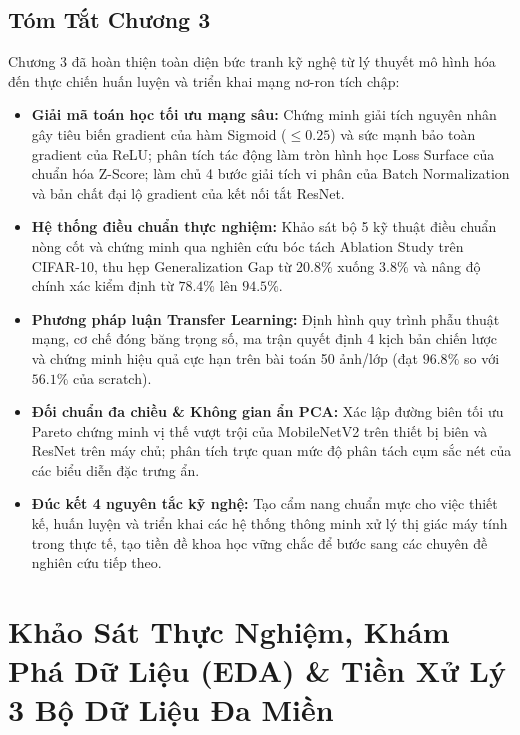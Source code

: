 \documentclass[12pt,a4paper]{report}
\begin{document}
\section{Tóm Tắt Chương 3}
Chương 3 đã hoàn thiện toàn diện bức tranh kỹ nghệ từ lý thuyết mô hình hóa đến thực chiến huấn luyện và triển khai mạng nơ-ron tích chập:
\begin{itemize}[noitemsep,topsep=2pt,leftmargin=*]
    \item \textbf{Giải mã toán học tối ưu mạng sâu:} Chứng minh giải tích nguyên nhân gây tiêu biến gradient của hàm Sigmoid ($\le 0.25$) và sức mạnh bảo toàn gradient của ReLU; phân tích tác động làm tròn hình học Loss Surface của chuẩn hóa Z-Score; làm chủ 4 bước giải tích vi phân của Batch Normalization và bản chất đại lộ gradient của kết nối tắt ResNet.
    \item \textbf{Hệ thống điều chuẩn thực nghiệm:} Khảo sát bộ 5 kỹ thuật điều chuẩn nòng cốt và chứng minh qua nghiên cứu bóc tách Ablation Study trên CIFAR-10, thu hẹp Generalization Gap từ $20.8\%$ xuống $3.8\%$ và nâng độ chính xác kiểm định từ $78.4\%$ lên $94.5\%$.
    \item \textbf{Phương pháp luận Transfer Learning:} Định hình quy trình phẫu thuật mạng, cơ chế đóng băng trọng số, ma trận quyết định 4 kịch bản chiến lược và chứng minh hiệu quả cực hạn trên bài toán 50 ảnh/lớp (đạt $96.8\%$ so với $56.1\%$ của scratch).
    \item \textbf{Đối chuẩn đa chiều \& Không gian ẩn PCA:} Xác lập đường biên tối ưu Pareto chứng minh vị thế vượt trội của MobileNetV2 trên thiết bị biên và ResNet trên máy chủ; phân tích trực quan mức độ phân tách cụm sắc nét của các biểu diễn đặc trưng ẩn.
    \item \textbf{Đúc kết 4 nguyên tắc kỹ nghệ:} Tạo cẩm nang chuẩn mực cho việc thiết kế, huấn luyện và triển khai các hệ thống thông minh xử lý thị giác máy tính trong thực tế, tạo tiền đề khoa học vững chắc để bước sang các chuyên đề nghiên cứu tiếp theo.
\end{itemize}

\chapter{Khảo Sát Thực Nghiệm, Khám Phá Dữ Liệu (EDA) \& Tiền Xử Lý 3 Bộ Dữ Liệu Đa Miền}
\end{document}
